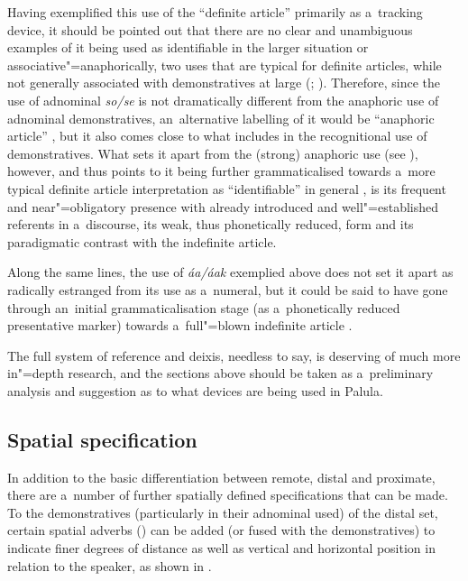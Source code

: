 Having exemplified this use of the ``definite article'' primarily as a~tracking device, it should be pointed out that there are no clear and unambiguous examples of it being used as identifiable in the larger situation or associative"=anaphorically, two uses that are typical for definite articles, while not generally associated with demonstratives at large (\citealt[485]{juvonen2006}; \citealt[233]{himmelmann1996}). Therefore, since the use of adnominal \textit{so/se} is not dramatically different from the anaphoric use of adnominal demonstratives, an~alternative labelling of it would be ``anaphoric article'' \citep[486]{juvonen2006}, but it also comes close to what \citet[230--239]{himmelmann1996} includes in the recognitional use of demonstratives. What sets it apart from the (strong) anaphoric use (see ), however, and thus points to it being further grammaticalised towards a~more typical definite article interpretation as ``identifiable'' in general \citep[485]{juvonen2006}, is its frequent and near"=obligatory presence with already introduced and well"=established referents in a~discourse, its weak, thus phonetically reduced, form and its paradigmatic contrast with the indefinite article.


Along the same lines, the use of \textit{áa/áak} exemplied above does not set it apart as radically estranged from its use as a~numeral, but it could be said to have gone through an~initial grammaticalisation stage (as a~phonetically reduced presentative marker) towards a~full"=blown indefinite article \citep[486]{juvonen2006}.



The full system of reference and deixis, needless to say, is deserving of much more in"=depth research, and the sections above should be taken as a~preliminary analysis and suggestion as to what devices are being used in Palula.


\subsection{Spatial specification}
\label{subsec:5-2-7}

In addition to the basic differentiation between remote, distal and proximate, there are a~number of further spatially defined specifications that can be made. To the demonstratives (particularly in their adnominal used) of the distal set, certain spatial adverbs () can be added (or fused with the demonstratives) to indicate finer degrees of distance as well as vertical and horizontal position in relation to the speaker, as shown in .


